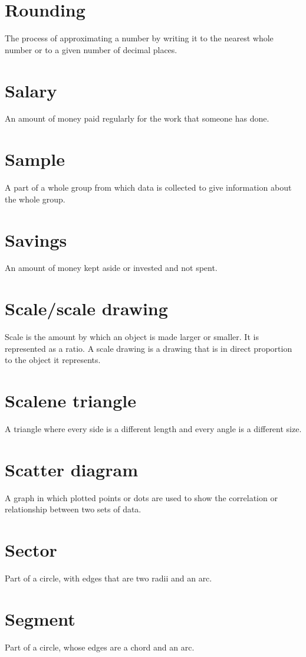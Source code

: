\documentclass[10pt]{article}
\begin{document}
\section*{Rounding}
The process of approximating a number by writing it to the nearest whole number or to a given number of decimal places.

\section*{Salary}
An amount of money paid regularly for the work that someone has done.

\section*{Sample}
A part of a whole group from which data is collected to give information about the whole group.

\section*{Savings}
An amount of money kept aside or invested and not spent.

\section*{Scale/scale drawing}
Scale is the amount by which an object is made larger or smaller. It is represented as a ratio. A scale drawing is a drawing that is in direct proportion to the object it represents.

\section*{Scalene triangle}
A triangle where every side is a different length and every angle is a different size.

\section*{Scatter diagram}
A graph in which plotted points or dots are used to show the correlation or relationship between two sets of data.

\section*{Sector}
Part of a circle, with edges that are two radii and an arc.

\section*{Segment}
Part of a circle, whose edges are a chord and an arc.
\end{document}
